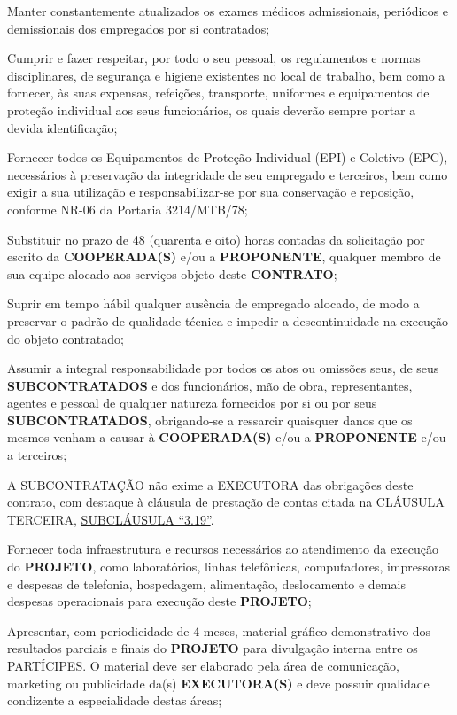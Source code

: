 \xx Manter constantemente atualizados os exames médicos admissionais, periódicos e demissionais dos empregados por si contratados;

\xx Cumprir e fazer respeitar, por todo o seu pessoal, os regulamentos e normas disciplinares, de segurança e higiene existentes no local de trabalho, bem como a fornecer, às suas expensas, refeições, transporte, uniformes e equipamentos de proteção individual aos seus funcionários, os quais deverão sempre portar a devida identificação;

\xx Fornecer todos os Equipamentos de Proteção Individual (EPI) e Coletivo (EPC), necessários à preservação da integridade de seu empregado e terceiros, bem como exigir a sua utilização e responsabilizar-se por sua conservação e reposição, conforme NR-06 da Portaria 3214/MTB/78;

\xx Substituir no prazo de 48 (quarenta e oito) horas contadas da solicitação por escrito da \textbf{COOPERADA(S)} e/ou a \textbf{PROPONENTE}, qualquer membro de sua equipe alocado aos serviços objeto deste \textbf{CONTRATO};

\xx Suprir em tempo hábil qualquer ausência de empregado alocado, de modo a preservar o padrão de qualidade técnica e impedir a descontinuidade na execução do objeto contratado;

\xx Assumir a integral responsabilidade por todos os atos ou omissões seus, de seus \textbf{SUBCONTRATADOS} e dos funcionários, mão de obra, representantes, agentes e pessoal de qualquer natureza fornecidos por si ou por seus \textbf{SUBCONTRATADOS}, obrigando-se a ressarcir quaisquer danos que os mesmos venham a causar à \textbf{COOPERADA(S)} e/ou a \textbf{PROPONENTE} e/ou a terceiros;

\xxx  A SUBCONTRATAÇÃO não exime a EXECUTORA das obrigações deste contrato, com destaque à cláusula de prestação de contas citada na CLÁUSULA TERCEIRA, \hyperlink{3.19}{SUBCLÁUSULA “3.19”}.

\xx Fornecer toda infraestrutura e recursos necessários ao atendimento da execução do \textbf{PROJETO}, como laboratórios, linhas telefônicas, computadores, impressoras e despesas de telefonia, hospedagem, alimentação, deslocamento e demais despesas operacionais para execução deste \textbf{PROJETO};

\xx Apresentar, com periodicidade de 4 meses, material gráfico demonstrativo dos resultados parciais e finais do \textbf{PROJETO} para divulgação interna entre os PARTÍCIPES. O material deve ser elaborado pela área de comunicação, marketing ou publicidade da(s) \textbf{EXECUTORA(S)} e deve possuir qualidade condizente a especialidade destas áreas;

